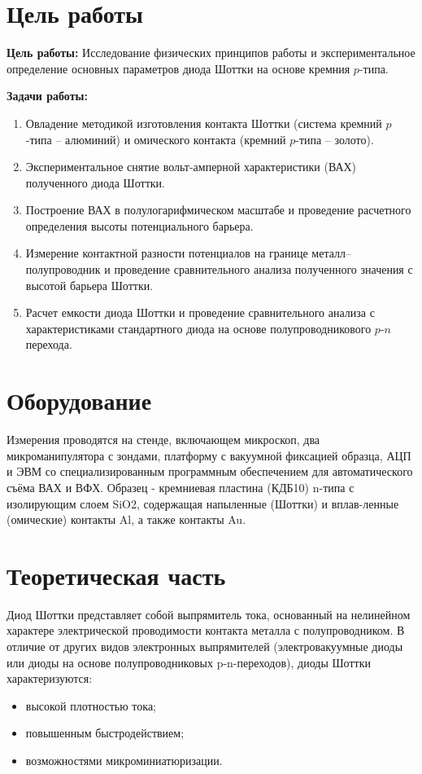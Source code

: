 \documentclass[a4paper,12pt]{article}
\begin{document}
\newpage

\section{Цель работы}
\textbf{Цель работы:} Исследование физических принципов работы и экспериментальное определение основных параметров диода Шоттки на основе кремния $p$-типа.

\textbf{Задачи работы:}
\begin{enumerate}
    \item Овладение методикой изготовления контакта Шоттки (система кремний $p$-типа -- алюминий) и омического контакта (кремний $p$-типа -- золото).
    \item Экспериментальное снятие вольт-амперной характеристики (ВАХ) полученного диода Шоттки.
    \item Построение ВАХ в полулогарифмическом масштабе и проведение расчетного определения высоты потенциального барьера.
    \item Измерение контактной разности потенциалов на границе металл--полупроводник и проведение сравнительного анализа полученного значения с высотой барьера Шоттки.
    \item Расчет емкости диода Шоттки и проведение сравнительного анализа с характеристиками стандартного диода на основе полупроводникового $p\text{-}n$ перехода.
\end{enumerate}

\section{Оборудование}
Измерения проводятся на стенде, включающем микроскоп, два микроманипулятора с зондами,
платформу с вакуумной фиксацией образца, АЦП и ЭВМ со специализированным программным
обеспечением для автоматического съёма ВАХ и ВФХ. Образец - кремниевая пластина (КДБ10) n-типа с изолирующим слоем SiO2, содержащая напыленные (Шоттки) и вплав-ленные (омические) контакты Al, а также контакты Au.

\section{Теоретическая часть}

Диод Шоттки представляет собой выпрямитель тока, основанный на нелинейном характере электрической проводимости контакта металла с полупроводником. В отличие от других видов электронных выпрямителей (электровакуумные диоды или диоды на основе полупроводниковых p-n-переходов), диоды Шоттки характеризуются:
\begin{itemize}
    \item высокой плотностью тока;
    \item повышенным быстродействием;
    \item возможностями микроминиатюризации.
\end{itemize}
\end{document}
